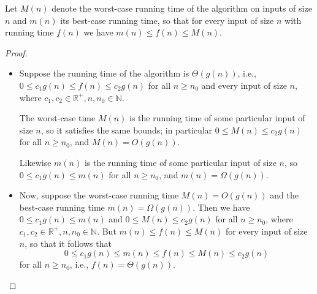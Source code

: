Let $M(n)$ denote the worst-case running time of the algorithm on inputs of size
$n$ and $m(n)$ its best-case running time, so that for every input of size $n$
with running time $f(n)$ we have $m(n) \leq f(n) \leq M(n)$.

\begin{proof}
  \begin{itemize}
    \item[$(\Rightarrow)$] Suppose the running time of the algorithm is
      $\Theta(g(n))$, i.e., $0 \leq c_1 g(n) \leq f(n) \leq c_2 g(n)$ for all
      $n \geq n_0$ and every input of size $n$, where $c_1, c_2 \in
      \mathbb{R}^+, n, n_0 \in \mathbb{N}$.

      The worst-case time $M(n)$ is the running time of some particular input of
      size $n$, so it satisfies the same bounds; in particular
      $0 \leq M(n) \leq c_2 g(n)$ for all $n \geq n_0$, and $M(n) = O(g(n))$.

      Likewise $m(n)$ is the running time of some particular input of size $n$,
      so $0 \leq c_1 g(n) \leq m(n)$ for all $n \geq n_0$, and
      $m(n) = \Omega(g(n))$.
    \item[$(\Leftarrow)$] Now, suppose the worst-case running time
      $M(n) = O(g(n))$ and the best-case running time $m(n) = \Omega(g(n))$.
      Then we have $0 \leq c_1 g(n) \leq m(n)$ and $0 \leq M(n) \leq c_2 g(n)$
      for all $n \geq n_0$, where $c_1, c_2 \in \mathbb{R}^+, n, n_0 \in
      \mathbb{N}$. But $m(n) \leq f(n) \leq M(n)$ for every input of size $n$,
      so that it follows that
      \[
        0 \leq c_1 g(n) \leq m(n) \leq f(n) \leq M(n) \leq c_2 g(n)
      \]
      for all $n \geq n_0$, i.e., $f(n) = \Theta(g(n))$.
  \end{itemize}
\end{proof}
